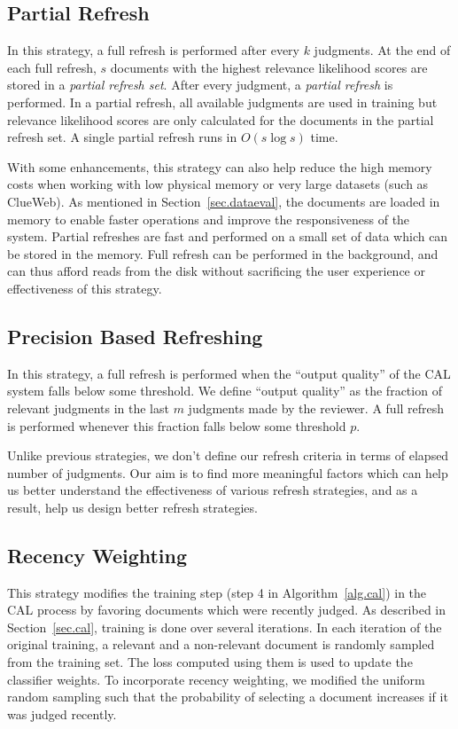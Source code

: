 \subsection*{Partial Refresh}

In this strategy, a full refresh is performed after every $k$ judgments. At the
end of each full refresh, $s$ documents with the highest relevance likelihood
scores are stored in a \textit{partial refresh set}. After every judgment, a
\textit{partial refresh} is performed. In a partial refresh, all available
judgments are used in training but relevance likelihood scores are only
calculated for the documents in the partial refresh set. A single partial
refresh runs in $O(s \log s)$ time.

With some enhancements, this strategy can also help reduce the high memory costs
when working with low physical memory or very large datasets (such as ClueWeb).
As mentioned in Section~\ref{sec.dataeval}, the documents are loaded in memory
to enable faster operations and improve the responsiveness of the system.
Partial refreshes are fast and performed on a small set of data which can be
stored in the memory. Full refresh can be performed in the background, and can
thus afford reads from the disk without sacrificing the user experience or
effectiveness of this strategy.

\subsection*{Precision Based Refreshing}

In this strategy, a full refresh is performed when the ``output quality'' of the
CAL system falls below some threshold. We define ``output quality'' as the
fraction of relevant judgments in the last $m$ judgments made by the reviewer. A
full refresh is performed whenever this fraction falls below some threshold $p$.

Unlike previous strategies, we don't define our refresh criteria in terms of
elapsed number of judgments. Our aim is to find more meaningful factors
which can help us better understand the effectiveness of various refresh
strategies, and as a result, help us design better refresh strategies.

\subsection*{Recency Weighting}

This strategy modifies the training step (step 4 in Algorithm~\ref{alg.cal}) in
the CAL process by favoring documents which were recently judged. As described
in Section~\ref{sec.cal}, training is done over several iterations. In each
iteration of the original training, a relevant and a non-relevant document is
randomly sampled from the training set. The loss computed using them is used to
update the classifier weights. To incorporate recency weighting, we modified the
uniform random sampling such that the probability of selecting a document
increases if it was judged recently.

